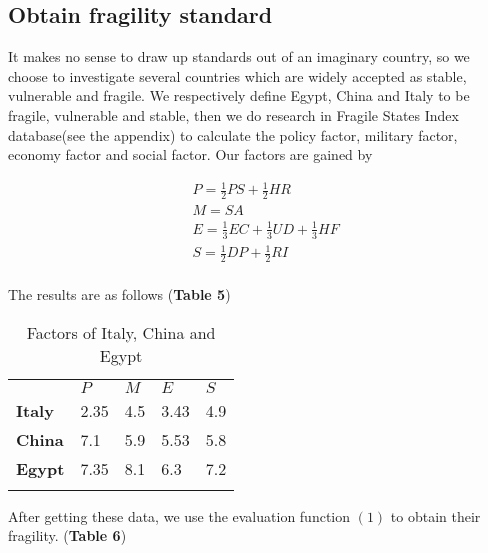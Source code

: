 \documentclass{mcmthesis}
\newlength\savedwidth
\newcommand\whline{\noalign{\global\savedwidth\arrayrulewidth
		\global\arrayrulewidth 1.2pt}%
	\hline
	\noalign{\global\arrayrulewidth\savedwidth}}
\newlength\savewidth
\newcommand\shline{\noalign{\global\savewidth\arrayrulewidth
		\global\arrayrulewidth 1.2pt}%
	\hline
	\noalign{\global\arrayrulewidth\savewidth}}
\begin{document}
	\subsection{Obtain fragility standard}
	It makes no sense to draw up standards out of an imaginary country, so we choose to investigate several countries which are widely accepted as stable, vulnerable and fragile.
	We respectively define Egypt, China and Italy to be fragile, vulnerable and stable, then we do research in Fragile States Index database(see the appendix) to calculate the policy factor, military factor, economy factor and social factor. Our factors are gained by 
	\begin{spacing}{1.5}
		\begin{equation}
		\begin{aligned}
		&P=\frac{1}{2}PS+\frac{1}{2}HR\\
		&M=SA\\
		&E=\frac{1}{3}EC+\frac{1}{3}UD+\frac{1}{3}HF\\
		&S=\frac{1}{2}DP+\frac{1}{2}RI\\
		\end{aligned}
		\end{equation}
	\end{spacing}
	
	The results are as follows (\textbf{Table 5})
	
	\begin{table}[htbp]
		\renewcommand\arraystretch{1.5}
		\footnotesize
		\centering
		\begin{tabular}{m{2cm}<{\centering}|m{2cm}<{\centering}|m{2cm}<{\centering}|m{2cm}<{\centering}|m{2cm}<{\centering}}
			\whline
			&\textbf{$P$}&\textbf{$M$}&\textbf{$E$}&\textbf{$S$}\\
			\whline
			\textbf{Italy}& 2.35 & 4.5 & 3.43 & 4.9\\
			
			\textbf{China}& 7.1 & 5.9 & 5.53 & 5.8\\
			
			\textbf{Egypt}& 7.35 & 8.1 & 6.3 & 7.2\\
			
			\shline
		\end{tabular}
		\caption{Factors of Italy, China and Egypt}\label{tab:Factors of Italy, China and Egypt}
	\end{table}
	After getting these data, we use the evaluation function $(1)$ to obtain their fragility. (\textbf{Table 6})
	
\end{document}
